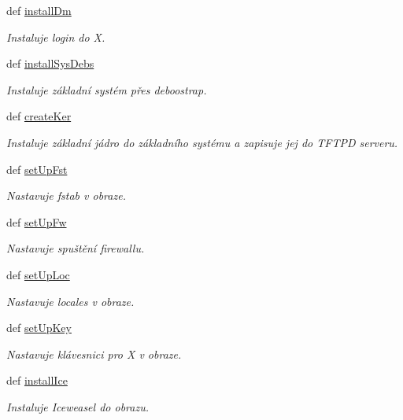 \begin{DoxyCompactItemize}
def \hyperlink{classConfSys_1_1ConfSys_acc9747fb9c27ec9b502f05f8e9038e93}{install\-Dm}
\begin{DoxyCompactList}\small\item\em Instaluje login do X. \end{DoxyCompactList}\item 
def \hyperlink{classConfSys_1_1ConfSys_a25b558cfd4ac44f9f75d82771079db7a}{install\-Sys\-Debs}
\begin{DoxyCompactList}\small\item\em Instaluje základní systém přes deboostrap. \end{DoxyCompactList}\item 
def \hyperlink{classConfSys_1_1ConfSys_a8b17a236bdf36c53b109b0d30add20a3}{create\-Ker}
\begin{DoxyCompactList}\small\item\em Instaluje základní jádro do základního systému a zapisuje jej do T\-F\-T\-P\-D serveru. \end{DoxyCompactList}\item 
def \hyperlink{classConfSys_1_1ConfSys_ab30f940b6063d918726bf098a1572dbd}{set\-Up\-Fst}
\begin{DoxyCompactList}\small\item\em Nastavuje fstab v obraze. \end{DoxyCompactList}\item 
def \hyperlink{classConfSys_1_1ConfSys_a8494e0b1d538ef981c3670e065bbfe78}{set\-Up\-Fw}
\begin{DoxyCompactList}\small\item\em Nastavuje spuštění firewallu. \end{DoxyCompactList}\item 
def \hyperlink{classConfSys_1_1ConfSys_ad2121d426e037b6ad07d747231fe6370}{set\-Up\-Loc}
\begin{DoxyCompactList}\small\item\em Nastavuje locales v obraze. \end{DoxyCompactList}\item 
def \hyperlink{classConfSys_1_1ConfSys_a6cd13575cfed138a3fa2fdeecc567000}{set\-Up\-Key}
\begin{DoxyCompactList}\small\item\em Nastavuje klávesnici pro X v obraze. \end{DoxyCompactList}\item 
def \hyperlink{classConfSys_1_1ConfSys_a75c24373b7f98875cb36979db32affb6}{install\-Ice}
\begin{DoxyCompactList}\small\item\em Instaluje Iceweasel do obrazu. \end{DoxyCompactList}\item 

\end{DoxyCompactItemize}
